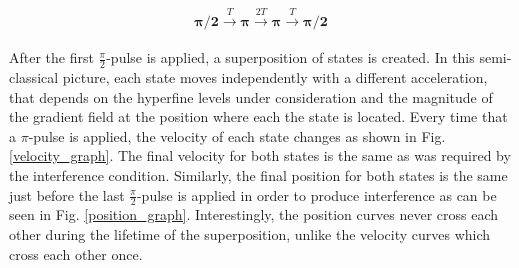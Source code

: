 \documentclass{article}
\begin{document}
\begin{equation}\label{pulses}
\boldsymbol{\pi/2} \xrightarrow[]{T} \boldsymbol{\pi} \xrightarrow[]{2T} \boldsymbol{\pi} \xrightarrow[]{T} \boldsymbol{\pi/2}
\end{equation}

After the first $\frac{\pi}{2}$-pulse is applied, a superposition of states is created. In this semi-classical picture, each state moves independently with a different acceleration, that depends on the hyperfine levels under consideration and the magnitude of the gradient field at the position where each the state is located. Every time that a $\pi$-pulse is applied, the velocity of each state changes as shown in Fig. \ref{velocity_graph}. The final velocity for both states is the same as was required by the interference condition. Similarly, the final position for both states is the same just before the last $\frac{\pi}{2}$-pulse is applied in order to produce interference as can be seen in Fig. \ref{position_graph}. Interestingly, the position curves never cross each other during the lifetime of the superposition, unlike the velocity curves which cross each other once.
\end{document}
